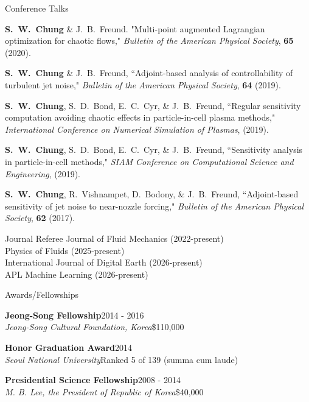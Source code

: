 \documentclass{resume} %
\begin{document}
\begin{rSection}{Conference Talks}
\par
\textbf{S.\ W.\ Chung} \& J.\ B.\ Freund. "Multi-point augmented Lagrangian optimization for chaotic flows,"
\textit{Bulletin of the American Physical Society}, \textbf{65} (2020).

\par
\textbf{S.\ W.\ Chung} \& J.\ B.\ Freund,
``Adjoint­-based analysis of controllability of turbulent jet noise,"
\textit{Bulletin of the American Physical Society}, \textbf{64} (2019).

\par
\textbf{S.\ W.\ Chung}, S.\ D.\ Bond, E.\ C.\ Cyr, \& J.\ B.\ Freund,
``Regular sensitivity computation avoiding chaotic effects in particle-in-cell plasma methods,"
\textit{International Conference on Numerical Simulation of Plasmas}, (2019).

\par
\textbf{S.\ W.\ Chung}, S.\ D.\ Bond, E.\ C.\ Cyr, \& J.\ B.\ Freund, ``Sensitivity analysis in particle-in-cell methods,"
\textit{SIAM Conference on Computational Science and Engineering}, (2019).

\par
\textbf{S.\ W.\ Chung}, R.\ Vishnampet, D.\ Bodony, \& J.\ B.\ Freund, ``Adjoint-based sensitivity of jet noise to near-nozzle forcing,"
\textit{Bulletin of the American Physical Society}, \textbf{62} (2017).
\end{rSection}

\begin{rSection}{Journal Referee}
Journal of Fluid Mechanics (2022-present)\\
Physics of Fluids (2025-present)\\
International Journal of Digital Earth (2026-present)\\
APL Machine Learning (2026-present)\\
\end{rSection}

\begin{rSection}{Awards/Fellowships}

{\bf Jeong-Song Fellowship}\hfill 2014 - 2016\\
{\it Jeong-Song Cultural Foundation, Korea}\hfill \$110,000

{\bf Honor Graduation Award}\hfill 2014\\
{\it Seoul National University}\hfill Ranked 5 of 139 (summa cum laude)

{\bf Presidential Science Fellowship}\hfill 2008 - 2014\\
{\it M. B. Lee, the President of Republic of Korea}\hfill \$40,000

\end{rSection}
\end{document}
